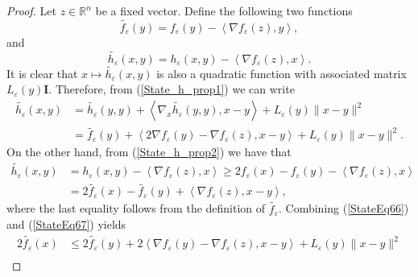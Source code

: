 \documentclass[11pt]{article}
\numberwithin{equation}{section}
\begin{document}
\begin{proof}
Let $z \in \mathbb{R}^n$ be a fixed vector. Define the following two functions
\begin{equation*}
	\widetilde{f_{\varepsilon}}(y) = f_{\varepsilon}(y) - \left\langle \nabla f_{\varepsilon}(z), y \right\rangle ,
\end{equation*}
and 
 \begin{equation*}
	\widetilde{h_{\varepsilon}}(x,y) = h_{\varepsilon}(x,y) - \left\langle \nabla f_{\varepsilon}(z), x \right\rangle .
\end{equation*}
It is clear that $x \mapsto \widetilde{h_{\varepsilon}}(x,y)$ is also a quadratic function with associated matrix $L_{\varepsilon}(y)\mathbf{I}$. Therefore, from (\ref{State_h_prop1}) we can write
\begin{equation}
\begin{aligned}
	\widetilde{h_{\varepsilon}}(x,y) &= \widetilde{h_{\varepsilon}}(y,y) + \left\langle \nabla_x \widetilde{h_{\varepsilon}}(y,y), x-y \right\rangle + L_{\varepsilon}(y) \|x-y\|^2 \\
	&= \widetilde{f_{\varepsilon}}(y) + \left\langle 2\nabla f_{\varepsilon}(y) - \nabla f_{\varepsilon}(z), x-y \right\rangle + L_{\varepsilon}(y) \|x-y\|^2.	\label{StateEq66}
\end{aligned}
\end{equation}
On the other hand, from (\ref{State_h_prop2}) we have that
\begin{equation}
\begin{aligned}
	\widetilde{h_{\varepsilon}}(x,y) &= h_{\varepsilon}(x,y) - \left\langle	\nabla f_{\varepsilon}(z),x \right\rangle \geq 2f_{\varepsilon}(x) - f_{\varepsilon}(y) - \left\langle \nabla f_{\varepsilon}(z),x \right\rangle \\
	&= 2 \widetilde{f_{\varepsilon}}(x) - \widetilde{f_{\varepsilon}}(y) + \left\langle \nabla f_{\varepsilon}(z), x-y \right\rangle, \label{StateEq67}
\end{aligned}
\end{equation}
where the last equality follows from the definition of $\widetilde{f_{\varepsilon}}$. Combining (\ref{StateEq66}) and (\ref{StateEq67}) yields
\begin{equation*}
\begin{aligned}
	2\widetilde{f_{\varepsilon}}(x) &\leq 2\widetilde{f_{\varepsilon}}(y) + 2 \left\langle \nabla f_{\varepsilon}(y) - \nabla f_{\varepsilon}(z), x-y \right\rangle + L_{\varepsilon}(y) \|x-y\|^2 \\

\end{aligned}
\end{equation*}
\end{proof}
\end{document}
